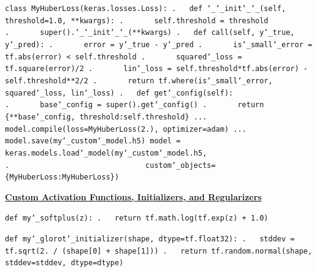 \texttt{class MyHuberLoss(keras.losses.Loss):\newline
.~~~def \char`_\char`_init\char`_\char`_(self, threshold=1.0, **kwargs):\newline
.~~~~~~~self.threshold = threshold\newline
.~~~~~~~super().\char`_\char`_init\char`_\char`_(**kwargs)\newline
.~~~def call(self, y\char`_true, y\char`_pred):\newline
.~~~~~~~error = y\char`_true - y\char`_pred\newline
.~~~~~~~is\char`_small\char`_error = tf.abs(error) < self.threshold\newline
.~~~~~~~squared\char`_loss = tf.square(error)/2\newline
.~~~~~~~lin\char`_loss  = self.threshold*tf.abs(error) - self.threshold**2/2\newline
.~~~~~~~return tf.where(is\char`_small\char`_error, squared\char`_loss, lin\char`_loss)\newline
.~~~def get\char`_config(self):\newline
.~~~~~~~base\char`_config = super().get\char`_config()\newline
.~~~~~~~return \{**base\char`_config, \textquotesingle threshold\textquotesingle:self.threshold\}\newline
...\newline
model.compile(loss=MyHuberLoss(2.), optimizer=\textquotesingle adam\textquotesingle)\newline
...\newline
model.save(\textquotesingle my\char`_custom\char`_model.h5\textquotesingle)\newline
model = keras.models.load\char`_model(\textquotesingle my\char`_custom\char`_model.h5\textquotesingle,\newline
.~~~~~~~~~~~~~~~~~~~~~~~~~~~~~~~custom\char`_objects=\{\textquotesingle MyHuberLoss\textquotesingle:MyHuberLoss\})}
\newpage

\textbf{\underline{Custom Activation Functions, Initializers, and Regularizers}}

\texttt{def my\char`_softplus(z):\newline
.~~~return tf.math.log(tf.exp(z) + 1.0)}

\texttt{def my\char`_glorot\char`_initializer(shape, dtype=tf.float32):\newline
.~~~stddev = tf.sqrt(2.~/ (shape[0] + shape[1]))\newline
.~~~return tf.random.normal(shape, stddev=stddev, dtype=dtype)}

